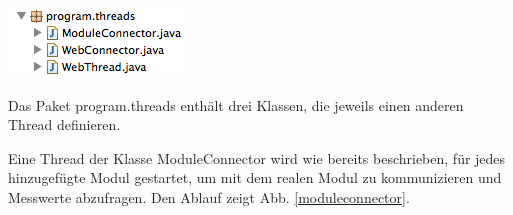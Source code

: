 \documentclass[a4paper,14pt,headsepline]{scrartcl}
\begin{document}
\includegraphics[width=0.22 \paperwidth]{./bilder/lib_threads.png}

Das Paket program.threads enthält drei Klassen, die jeweils einen anderen Thread definieren. 

Eine Thread der Klasse ModuleConnector wird wie bereits beschrieben, für jedes hinzugefügte Modul gestartet, um mit dem realen Modul zu kommunizieren und Messwerte abzufragen. Den Ablauf zeigt Abb. \ref{moduleconnector}.

\begin{figure}[h]
\begin{center}
\end{center}
\end{figure}

\newpage
\end{document}
